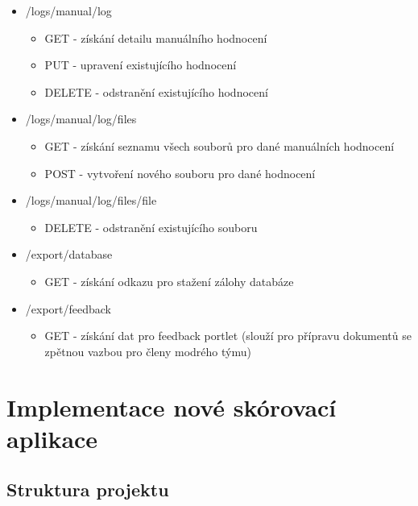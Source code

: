 \documentclass[
  digital, %
  twoside, %
  table,   %
  lof,     %
  lot,     %
]{fithesis3}
\begin{document}
\begin{itemize}
    \item /logs/manual/{log}
    \begin{itemize}
        \item GET - získání detailu manuálního hodnocení
        \item PUT - upravení existujícího hodnocení
        \item DELETE - odstranění existujícího hodnocení
    \end{itemize}
            
    \item /logs/manual/{log}/files
    \begin{itemize}
        \item GET - získání seznamu všech souborů pro dané manuálních hodnocení
        \item POST - vytvoření nového souboru pro dané hodnocení
    \end{itemize}
            
    \item /logs/manual/{log}/files/{file}
    \begin{itemize}
        \item DELETE - odstranění existujícího souboru
    \end{itemize}
            
    \item /export/database
    \begin{itemize}
        \item GET - získání odkazu pro stažení zálohy databáze
    \end{itemize}
                
    \item /export/feedback
    \begin{itemize}
        \item GET - získání dat pro feedback portlet (slouží pro přípravu dokumentů se zpětnou vazbou pro členy modrého týmu)
    \end{itemize}

\end{itemize}




\chapter{Implementace nové skórovací aplikace}

\section{Struktura projektu}
\end{document}

